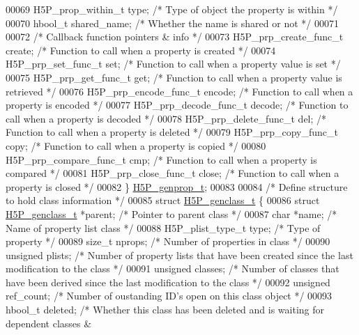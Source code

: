 \begin{DoxyCode}
00069     H5P\_prop\_within\_t type;     \textcolor{comment}{/* Type of object the property is within */}
00070     hbool\_t shared\_name;   \textcolor{comment}{/* Whether the name is shared or not */}
00071 
00072     \textcolor{comment}{/* Callback function pointers & info */}
00073     H5P\_prp\_create\_func\_t create;   \textcolor{comment}{/* Function to call when a property is created */}
00074     H5P\_prp\_set\_func\_t \textcolor{keyword}{set}; \textcolor{comment}{/* Function to call when a property value is set */}
00075     H5P\_prp\_get\_func\_t \textcolor{keyword}{get}; \textcolor{comment}{/* Function to call when a property value is retrieved */}
00076     H5P\_prp\_encode\_func\_t encode; \textcolor{comment}{/* Function to call when a property is encoded */}
00077     H5P\_prp\_decode\_func\_t decode; \textcolor{comment}{/* Function to call when a property is decoded */}
00078     H5P\_prp\_delete\_func\_t del; \textcolor{comment}{/* Function to call when a property is deleted */}
00079     H5P\_prp\_copy\_func\_t copy;  \textcolor{comment}{/* Function to call when a property is copied */}
00080     H5P\_prp\_compare\_func\_t cmp; \textcolor{comment}{/* Function to call when a property is compared */}
00081     H5P\_prp\_close\_func\_t close; \textcolor{comment}{/* Function to call when a property is closed */}
00082 \} \hyperlink{struct_h5_p__genprop__t}{H5P\_genprop\_t};
00083 
00084 \textcolor{comment}{/* Define structure to hold class information */}
00085 \textcolor{keyword}{struct }\hyperlink{struct_h5_p__genclass__t}{H5P\_genclass\_t} \{
00086     \textcolor{keyword}{struct }\hyperlink{struct_h5_p__genclass__t}{H5P\_genclass\_t} *parent;     \textcolor{comment}{/* Pointer to parent class */}
00087     \textcolor{keywordtype}{char}      *name;       \textcolor{comment}{/* Name of property list class */}
00088     H5P\_plist\_type\_t type; \textcolor{comment}{/* Type of property */}
00089     \textcolor{keywordtype}{size\_t}     nprops;     \textcolor{comment}{/* Number of properties in class */}
00090     \textcolor{keywordtype}{unsigned}   plists;     \textcolor{comment}{/* Number of property lists that have been created since the last modification
       to the class */}
00091     \textcolor{keywordtype}{unsigned}   classes;    \textcolor{comment}{/* Number of classes that have been derived since the last modification to the
       class */}
00092     \textcolor{keywordtype}{unsigned}   ref\_count;  \textcolor{comment}{/* Number of oustanding ID's open on this class object */}
00093     hbool\_t    deleted;    \textcolor{comment}{/* Whether this class has been deleted and is waiting for dependent classes &
}
\end{DoxyCode}
